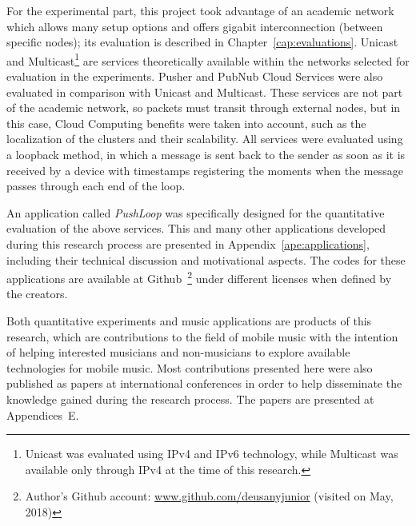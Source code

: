 For the experimental part, this project took advantage of an academic network which allows many setup options and offers gigabit interconnection (between specific nodes); its evaluation is described in Chapter~\ref{cap:evaluations}.
Unicast and Multicast\footnote{Unicast was evaluated using IPv4 and IPv6 technology, while Multicast was available only through IPv4 at the time of this research.} are services theoretically available within the networks selected for evaluation in the experiments.
Pusher and PubNub Cloud Services were also evaluated in comparison with Unicast and Multicast.
These services are not part of the academic network, so packets must transit through external nodes, but in this case, Cloud Computing benefits were taken into account, such as the localization of the clusters and their scalability.
All services were evaluated using a loopback method, in which a message is sent back to the sender as soon as it is received by a device with timestamps registering the moments when the message passes through each end of the loop.

An application called \textit{PushLoop} was specifically designed for the quantitative evaluation of the above services.
This and many other applications developed during this research process are presented in Appendix~\ref{ape:applications}, including their technical discussion and motivational aspects.
The codes for these applications are available at Github~\footnote{Author's Github account: \url{www.github.com/deusanyjunior} (visited on May, 2018)} under different licenses when defined by the creators.

Both quantitative experiments and music applications are products of this research, which are contributions to the field of mobile music with the intention of helping interested musicians and non-musicians to explore available technologies for mobile music.
Most contributions presented here were also published as papers at international conferences in order to help disseminate the knowledge gained during the research process.
The papers are presented at Appendices~E.

